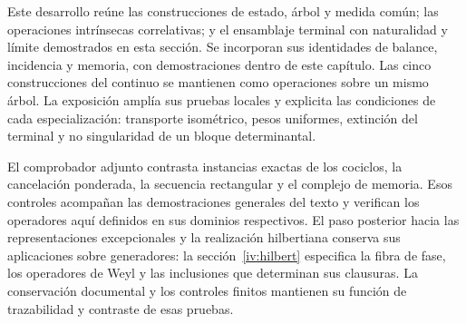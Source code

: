 Este desarrollo reúne las construcciones de estado, árbol y medida común; las operaciones intrínsecas correlativas; y el ensamblaje terminal con naturalidad y límite demostrados en esta sección. Se incorporan sus identidades de balance, incidencia y memoria, con demostraciones dentro de este capítulo. Las cinco construcciones del continuo se mantienen como operaciones sobre un mismo árbol. La exposición amplía sus pruebas locales y explicita las condiciones de cada especialización: transporte isométrico, pesos uniformes, extinción del terminal y no singularidad de un bloque determinantal.

El comprobador adjunto contrasta instancias exactas de los cociclos, la cancelación ponderada, la secuencia rectangular y el complejo de memoria. Esos controles acompañan las demostraciones generales del texto y verifican los operadores aquí definidos en sus dominios respectivos. El paso posterior hacia las representaciones excepcionales y la realización hilbertiana conserva sus aplicaciones sobre generadores: la sección~\ref{iv:hilbert} especifica la fibra de fase, los operadores de Weyl y las inclusiones que determinan sus clausuras. La conservación documental y los controles finitos mantienen su función de trazabilidad y contraste de esas pruebas.
